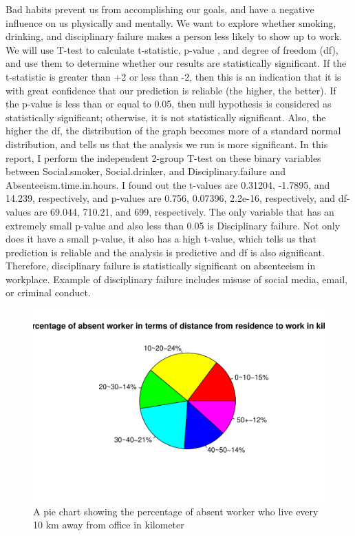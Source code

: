 \documentclass{article}
\begin{document}
Bad habits prevent us from accomplishing our goals, and have a negative influence on us physically and mentally. We want to explore whether smoking, drinking, and disciplinary failure makes a person less likely to show up to work. We will use T-test \cite{team_2021} to calculate t-statistic, p-value \cite{[mcleod_1970}, and degree of freedom (df), and use them to determine whether our results are statistically significant. If the t-statistic is greater than +2 or less than -2, then this is an indication that it is with great confidence that our prediction is reliable (the higher, the better). If the p-value is less than or equal to 0.05, then null hypothesis is considered as statistically significant; otherwise, it is not statistically significant. Also, the higher the df, the distribution of the graph becomes more of a standard normal distribution, and tells us that the analysis we run is more significant. In this report, I perform the independent 2-group T-test on these binary variables between Social.smoker, Social.drinker, and Disciplinary.failure and Absenteeism.time.in.hours. I found out the t-values are 0.31204, -1.7895, and 14.239, respectively, and p-values are 0.756, 0.07396, 2.2e-16, respectively, and df-values are 69.044, 710.21, and 699, respectively. The only variable that has an extremely small p-value and also less than 0.05 is Disciplinary failure. Not only does it have a small p-value, it also has a high t-value, which tells us that prediction is reliable and the analysis is predictive and df is also significant. Therefore, disciplinary failure is statistically significant on absenteeism in workplace. Example of disciplinary failure includes misuse of social media, email, or criminal conduct. \cite{cosentino_2022}
\begin{figure}[h]
 \centering
 \begin{minipage}[b]{.5\textwidth}
  \includegraphics[width=1\linewidth]{pie_distribution.pdf}
  \caption{A pie chart showing the percentage of absent worker who live every 10 km away from office in kilometer}
 \end{minipage}
\end{figure}
\end{document}
